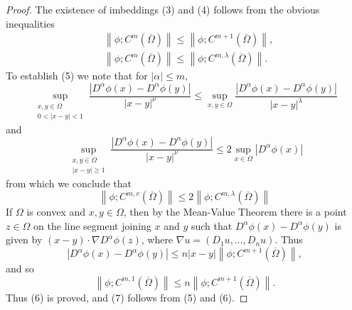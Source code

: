 \begin{proof}
  The existence of imbeddings (3) and (4) follows from the obvious inequalities
  \[
  \begin{aligned}
  & \left\|\phi ; C^m(\overline{\Omega})\right\| \leq\left\|\phi ; C^{m+1}(\overline{\Omega})\right\|, \\
  & \left\|\phi ; C^m(\overline{\Omega})\right\| \leq\left\|\phi ; C^{m, \lambda}(\overline{\Omega})\right\| .
  \end{aligned}
  \]
  To establish (5) we note that for $|\alpha| \leq m$,
  \[
  \sup_{\substack{x, y \in \Omega \\ 0<|x-y|<1}}
  \frac{\left|D^\alpha \phi(x)-D^\alpha \phi(y)\right|}{|x-y|^\nu}
  \leq \sup _{x, y \in \Omega} \frac{\left|D^\alpha \phi(x)-D^\alpha \phi(y)\right|}{|x-y|^\lambda}
  \]
  and
  \[
    \sup_{\substack{x, y\in \Omega \\ |x-y| \geq 1}}
    \frac{\left|D^\alpha \phi(x)-D^\alpha \phi(y)\right|}{|x-y|^\nu}
    \leq 2 \sup _{x \in \Omega}\left|D^\alpha \phi(x)\right|
  \]
  from which we conclude that
  \[
  \left\|\phi ; C^{m, v}(\overline{\Omega})\right\| \leq 2\left\|\phi ; C^{m, \lambda}(\overline{\Omega})\right\|
  \]
  If $\Omega$ is convex and $x, y \in \Omega$, then by the Mean-Value Theorem there is a point $z \in \Omega$ on the line segment joining $x$ and $y$ such that $D^\alpha \phi(x)-D^\alpha \phi(y)$ is given by $(x-y) \cdot \nabla D^\alpha \phi(z)$, where $\nabla u=\left(D_1 u, \ldots, D_n u\right)$. Thus
  \begin{equation}\label{eq:1.8}
    \left|D^\alpha \phi(x)-D^\alpha \phi(y)\right|
    \leq n|x-y|\left\|\phi ; C^{m+1}(\overline{\Omega})\right\|,
  \end{equation}
  and so
  \[
  \left\|\phi ; C^{m, 1}(\overline{\Omega})\right\| \leq n\left\|\phi ; C^{m+1}(\overline{\Omega})\right\|.
  \]
  Thus (6) is proved, and (7) follows from (5) and (6).


\end{proof}
